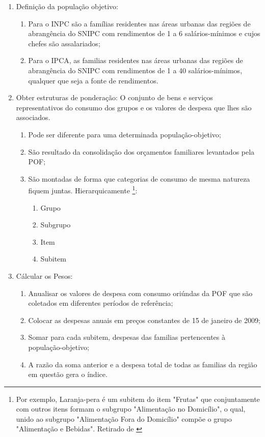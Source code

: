 \documentclass[twoside,a4paper,11pt]{report}
\begin{document}
\begin{enumerate}
  \item Definição da população objetivo: 
  \begin{enumerate} 
    \item Para o INPC são a famílias residentes nas áreas urbanas das regiões de abrangência do SNIPC com rendimentos de 1 a 6 salários-mínimos e cujos chefes são assalariados; 
    \item Para o IPCA, as familias residentes nas áreas urbanas das regiões de abrangência do SNIPC com rendimentos de 1 a 40 salários-mínimos, qualquer que seja a fonte de rendimentos.
  \end{enumerate}
  \item Obter estruturas de ponderação: O conjunto de bens e serviços representativos do consumo dos grupos e os valores de despesa que lhes são associados. 
  \begin{enumerate}
    \item Pode ser diferente para uma determinada população-objetivo;
    \item São resultado da consolidação dos orçamentos familiares levantados pela POF;
    \item São montadas de forma que categorias de consumo de mesma natureza fiquem juntas. Hierarquicamente \footnote[2]{Por exemplo, Laranja-pera é um subitem do item "Frutas" que conjuntamente com outros itens formam o subgrupo "Alimentação no Domicílio", o qual, unido ao subgrupo "Alimentação Fora do Domicílio" compõe o grupo "Alimentação e Bebidas". Retirado de \citet{ibgemetodos}}: 
    \begin{enumerate}
      \item Grupo
      \item Subgrupo
      \item Item
      \item Subitem
    \end{enumerate}
  \end{enumerate}
  \item Cálcular os Pesos:
  \begin{enumerate}
    \item Anualisar os valores de despesa com consumo oriúndas da POF que são coletados em diferentes períodos de referência;
    \item Colocar as despesas anuais em preços constantes de 15 de janeiro de 2009;
    \item Somar para cada subitem, despesas das familias pertencentes à população-objetivo;
    \item A razão da soma anterior e a despesa total de todas as familias da região em questão gera o índice.

\end{enumerate}
\end{enumerate}
\end{document}
